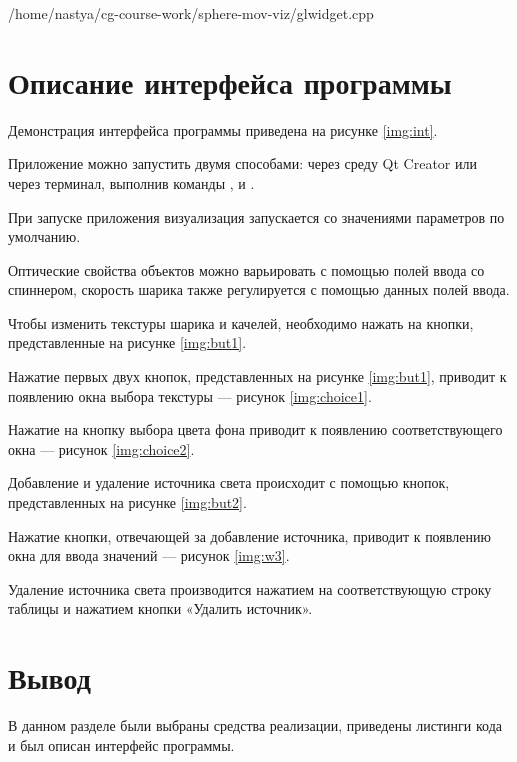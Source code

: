 \begin{lstinputlisting}[
	caption={Создание текстур карт теней},
	label={lst:shadcreate},
	style={cpp},
	linerange={74-92},
	]{/home/nastya/cg-course-work/sphere-mov-viz/glwidget.cpp}
\end{lstinputlisting}

\section{Описание интерфейса программы}

Демонстрация интерфейса программы приведена на рисунке \ref{img:int}.


Приложение можно запустить двумя способами: через среду Qt Creator или через терминал, выполнив команды ,  и .

При запуске приложения визуализация запускается со значениями параметров по умолчанию.

Оптические свойства объектов можно варьировать с помощью полей ввода со спиннером, скорость шарика также регулируется с помощью данных полей ввода.

Чтобы изменить текстуры шарика и качелей, необходимо нажать на кнопки, представленные на рисунке \ref{img:but1}.

\pagebreak

Нажатие первых двух кнопок, представленных на рисунке \ref{img:but1}, приводит к появлению окна выбора текстуры --- рисунок \ref{img:choice1}.

\pagebreak

Нажатие на кнопку выбора цвета фона приводит к появлению соответствующего окна --- рисунок \ref{img:choice2}.


Добавление и удаление источника света происходит с помощью кнопок, представленных на рисунке \ref{img:but2}.

\pagebreak

Нажатие кнопки, отвечающей за добавление источника, приводит к появлению окна для ввода значений --- рисунок \ref{img:w3}.


Удаление источника света производится нажатием на соответствующую строку таблицы и нажатием кнопки «Удалить источник».

\section*{Вывод}

В данном разделе были выбраны средства реализации, приведены листинги кода и был описан интерфейс программы.
